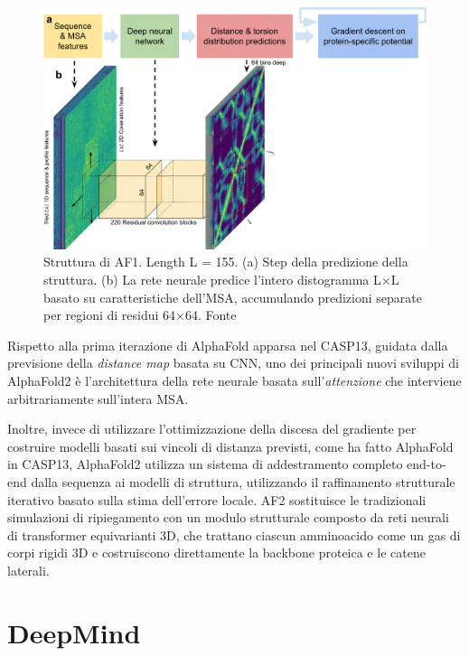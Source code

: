 \begin{figure}[!htb]
	\centering
	\includegraphics[scale=0.5]{images/af1.png}
	\caption{ Struttura di AF1. Length L = 155. (a) Step della predizione della struttura. (b) La rete neurale predice l'intero distogramma L×L basato su caratteristiche dell'MSA, accumulando predizioni separate per regioni di residui 64×64. Fonte\cite{senior2020improved}}
	\label{fig:af1}
\end{figure}

\par Rispetto alla prima iterazione di AlphaFold apparsa nel CASP13, guidata dalla previsione della \textit{distance map }basata su CNN, uno dei principali nuovi sviluppi di AlphaFold2 è l'architettura della rete neurale basata sull'\textit{attenzione} che interviene arbitrariamente sull'intera MSA. 

\par Inoltre, invece di utilizzare l'ottimizzazione della discesa del gradiente per costruire modelli basati sui vincoli di distanza previsti, come ha fatto AlphaFold in CASP13, AlphaFold2 utilizza un sistema di addestramento completo end-to-end dalla sequenza ai modelli di struttura, utilizzando il raffinamento strutturale iterativo basato sulla stima dell'errore locale. AF2 sostituisce le tradizionali simulazioni di ripiegamento con un modulo strutturale composto da reti neurali di transformer equivarianti 3D, che trattano ciascun amminoacido come un gas di corpi rigidi 3D e costruiscono direttamente la backbone proteica e le catene laterali.

\section{DeepMind}


